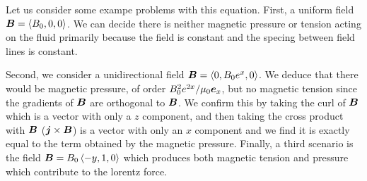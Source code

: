 \documentclass{article}
\begin{document}
Let us consider some exampe problems with this equation. First, a uniform field
$\boldsymbol{B} = \left< B_0, 0, 0\right>$. We can decide there is neither magnetic pressure
or tension acting on the fluid primarily because the field is constant and the
specing between field lines is constant. 

Second, we consider a unidirectional field $\boldsymbol{B} = \left< 0, B_0e^x, 0\right>$. We
deduce that there would be magnetic pressure, of order $B_0^2e^{2x}/\mu_0\boldsymbol{e}_x$, but no
magnetic tension since the gradients of $\boldsymbol{B}$ are orthogonal to $\boldsymbol{B}$. We confirm
this by taking the curl of $\boldsymbol{B}$ which is a vector with only a $z$ component, and
then taking the cross product with $\boldsymbol{B}$ ($\boldsymbol{j} \times \boldsymbol{B}$) is a vector with
only an $x$ component and we find it is exactly equal to the term obtained by
the magnetic pressure. Finally, a third scenario is the field $\boldsymbol{B} = B_0\left<
-y, 1, 0\right>$ which produces both magnetic tension and pressure which
contribute to the lorentz force. 


\begin{gather*}
\end{gather*}
\end{document}
